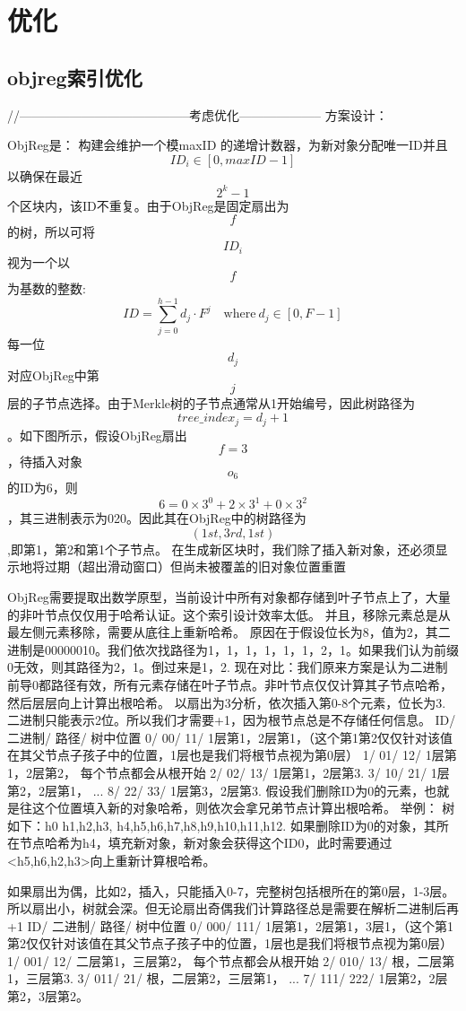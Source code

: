 \chapter{优化}
\section{objreg索引优化}
//-----------------------------------------考虑优化--------------------
方案设计：

ObjReg是：
构建会维护一个模maxID 的递增计数器，为新对象分配唯一ID并且$$ID_i\in[0,maxID-1]$$以确保在最近$$2^k-1$$个区块内，该ID不重复。由于ObjReg是固定扇出为$$f$$的树，所以可将$$ID_i$$视为一个以$$f$$为基数的整数:
$$ID=\sum_{j=0}^{h-1}d_j\cdot F^j\quad\mathrm{where~}d_j\in[0,F-1]$$
每一位$$d_j$$对应ObjReg中第$$j$$层的子节点选择。由于Merkle树的子节点通常从1开始编号，因此树路径为$$tree\_index_{j} = d_j+1$$。如下图所示，假设ObjReg扇出$$f = 3$$，待插入对象$$o_6$$的ID为6，则$$6 = 0\times3^0+2\times3^1+0\times3^2$$，其三进制表示为020。因此其在ObjReg中的树路径为$$(1st,3rd,1st)$$,即第1，第2和第1个子节点。
在生成新区块时，我们除了插入新对象，还必须显示地将过期（超出滑动窗口）但尚未被覆盖的旧对象位置重置


ObjReg需要提取出数学原型，当前设计中所有对象都存储到叶子节点上了，大量的非叶节点仅仅用于哈希认证。这个索引设计效率太低。
并且，移除元素总是从最左侧元素移除，需要从底往上重新哈希。
原因在于假设位长为8，值为2，其二进制是00000010。我们依次找路径为1，1，1，1，1，1，2，1。如果我们认为前缀0无效，则其路径为2，1。倒过来是1，2.
现在对比：我们原来方案是认为二进制前导0都路径有效，所有元素存储在叶子节点。非叶节点仅仅计算其子节点哈希，然后层层向上计算出根哈希。
以扇出为3分析，依次插入第0-8个元素，位长为3. 二进制只能表示2位。所以我们才需要+1，因为根节点总是不存储任何信息。
ID/ 二进制/ 路径/   树中位置
0/  00/    11/    1层第1，2层第1，（这个第1第2仅仅针对该值在其父节点子孩子中的位置，1层也是我们将根节点视为第0层）
1/  01/    12/    1层第1，2层第2， 每个节点都会从根开始
2/  02/    13/    1层第1，2层第3.     
3/  10/    21/    1层第2，2层第1，
... 
8/  22/    33/    1层第3，2层第3. 
假设我们删除ID为0的元素，也就是往这个位置填入新的对象哈希，则依次会拿兄弟节点计算出根哈希。
举例：
树如下：h0
h1,h2,h3,
h4,h5,h6,h7,h8,h9,h10,h11,h12.
如果删除ID为0的对象，其所在节点哈希为h4，填充新对象，新对象会获得这个ID0，此时需要通过<h5,h6,h2,h3>向上重新计算根哈希。

如果扇出为偶，比如2，插入，只能插入0-7，完整树包括根所在的第0层，1-3层。所以扇出小，树就会深。但无论扇出奇偶我们计算路径总是需要在解析二进制后再+1
ID/ 二进制/ 路径/   树中位置
0/  000/    111/    1层第1，2层第1，3层1，（这个第1第2仅仅针对该值在其父节点子孩子中的位置，1层也是我们将根节点视为第0层）
1/  001/    12/    二层第1，三层第2， 每个节点都会从根开始
2/  010/    13/    根，二层第1，三层第3.     
3/  011/    21/    根，二层第2，三层第1，
... 
7/  111/    222/    1层第2，2层第2，3层第2。




